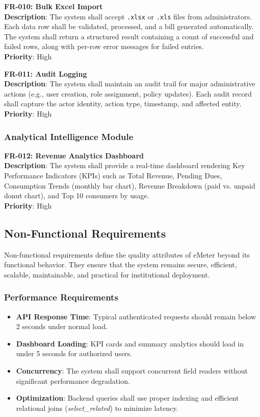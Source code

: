 \documentclass[12pt, a4paper, onecolumn]{report}
\begin{document}
\textbf{FR-010: Bulk Excel Import} \\
\textbf{Description}: The system shall accept \texttt{.xlsx} or \texttt{.xls} files from administrators. Each data row shall be validated, processed, and a bill generated automatically. The system shall return a structured result containing a count of successful and failed rows, along with per-row error messages for failed entries. \\
\textbf{Priority}: High

\textbf{FR-011: Audit Logging} \\
\textbf{Description}: The system shall maintain an audit trail for major administrative actions (e.g., user creation, role assignment, policy updates). Each audit record shall capture the actor identity, action type, timestamp, and affected entity. \\
\textbf{Priority}: High

\subsubsection{Analytical Intelligence Module}

\textbf{FR-012: Revenue Analytics Dashboard} \\
\textbf{Description}: The system shall provide a real-time dashboard rendering Key Performance Indicators (KPIs) such as Total Revenue, Pending Dues, Consumption Trends (monthly bar chart), Revenue Breakdown (paid vs. unpaid donut chart), and Top 10 consumers by usage. \\
\textbf{Priority}: High

\subsection{Non-Functional Requirements}

Non-functional requirements define the quality attributes of eMeter beyond its functional behavior. They ensure that the system remains secure, efficient, scalable, maintainable, and practical for institutional deployment.

\subsubsection{Performance Requirements}
\begin{itemize}
    \item \textbf{API Response Time}: Typical authenticated requests should remain below 2 seconds under normal load.
    \item \textbf{Dashboard Loading}: KPI cards and summary analytics should load in under 5 seconds for authorized users.
    \item \textbf{Concurrency}: The system shall support concurrent field readers without significant performance degradation.
    \item \textbf{Optimization}: Backend queries shall use proper indexing and efficient relational joins (\textit{select\_related}) to minimize latency.
\end{itemize}
\end{document}
